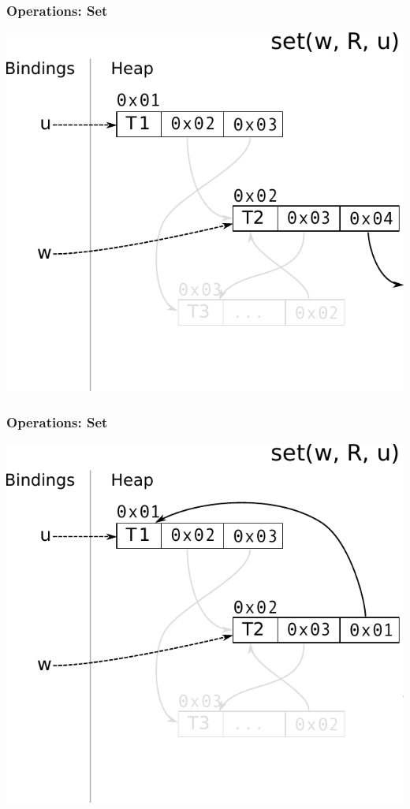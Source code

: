 \documentclass[utf8x]{beamer}
\begin{document}
\begin{frame}[plain]
  \frametitle{Operations: Set}
  \includegraphics[scale=0.8]{figures/set01}
\end{frame}

\begin{frame}[plain]
  \frametitle{Operations: Set}
  \includegraphics[scale=0.8]{figures/set02}
\end{frame}
\end{document}
